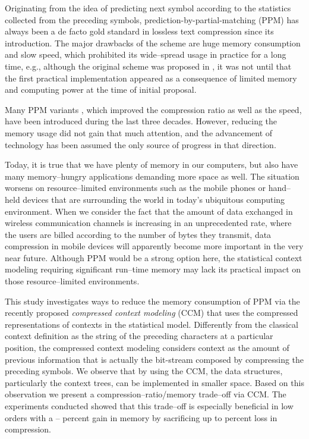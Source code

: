 \documentclass[runningheads,a4paper]{llncs}
\begin{document}
Originating from the idea of predicting next symbol according to the statistics collected from the preceding symbols, 
prediction-by-partial-matching (PPM) has always been a de facto gold standard in lossless text compression since its
introduction. 
The major drawbacks of the scheme are huge memory consumption and slow speed, which prohibited its wide--spread usage in
practice for a long time, e.g.,  although the original scheme was proposed in  \cite{CW84},
it was not until  \cite{Moffat90} that the first practical implementation appeared as a consequence of limited
memory and computing power at the time of initial proposal. 

Many PPM variants \cite{Moffat90,WB91,HV94,CTW95,Bloom98,shkarin2002ppm}, which improved the compression ratio as
well as the speed, have been introduced during the last three decades. 
However, reducing the memory usage did not gain that much attention, and the advancement of technology has been assumed
the only source of progress in that direction. 

Today, it is true that we have plenty of memory in our computers, but also have many memory--hungry applications
demanding more space as well. 
The situation worsens on resource--limited environments such as the mobile phones or hand--held devices that are
surrounding the world in today's ubiquitous computing environment. 
When we consider the fact that the amount of data exchanged in wireless communication channels is increasing in an
unprecedented rate, where the users are billed according to the number of bytes they transmit, data
compression in mobile devices will apparently become more important in the very near future. 
Although {PPM} would be a strong option here, the statistical context modeling requiring significant run--time memory
may lack its practical impact on those resource--limited environments.

This study investigates ways to reduce the memory consumption of {PPM} via the recently proposed
\emph{compressed context modeling} (CCM) \cite{Kulekci11} that uses the compressed representations of contexts in the
statistical model. 
Differently from the classical context definition  as the string  of the preceding characters at a particular position,
the compressed context modeling considers context as the  amount of previous information that is actually the
bit-stream composed by compressing the preceding symbols.  
We observe that by using the {CCM}, the data structures, particularly the context trees, can be implemented in smaller
space. Based on this observation we present a compression--ratio/memory trade--off via CCM.  The experiments
conducted
showed that this trade--off is especially beneficial in low orders with a  -- percent gain
in memory by sacrificing up to  percent loss in compression. 
\end{document}
